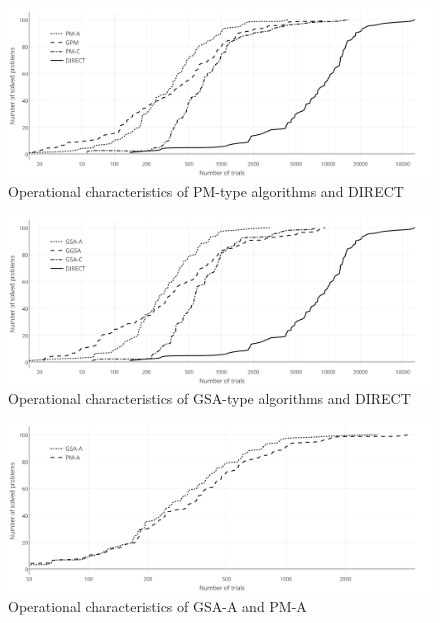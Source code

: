 \documentclass[preprint]{elsarticle}
\begin{document}
\begin{figure}[H]
  \includegraphics[width=\textwidth]{figure2.pdf}
  \caption{\label{fig:ops_pm} Operational characteristics of PM-type algorithms and DIRECT}
\end{figure}

\begin{figure}[H]
  \includegraphics[width=\textwidth]{figure3.pdf}
  \caption{\label{fig:ops_gsa} Operational characteristics of GSA-type algorithms and DIRECT}
\end{figure}

\begin{figure}[H]
  \includegraphics[width=\textwidth]{figure4.pdf}
  \caption{\label{fig:ops_gsa_pm} Operational characteristics of GSA-A and PM-A}
\end{figure}
\end{document}
